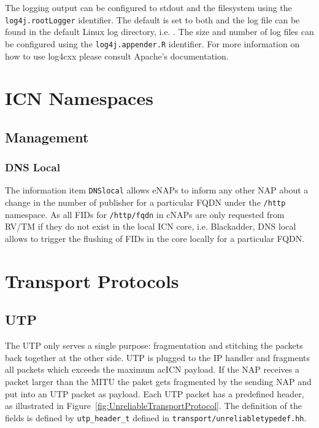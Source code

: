 \documentclass[a4paper,11pt,titlepage]{report}
\begin{document}
The logging output can be configured to stdout and the filesystem using the \texttt{log4j.rootLogger} identifier. The default is set to both and the log file can be found in the default Linux log directory, i.e. . The size and number of log files can be configured using the \texttt{log4j.appender.R} identifier. For more information on how to use log4cxx please consult Apache's documentation.

\chapter{ICN Namespaces}\label{ch:IcnNamespaces}
\section{Management}\label{sec:IcnNamespaces_Management}
\subsection{DNS Local}
The information item \texttt{DNSlocal} allows \acp{eNAP} to inform any other \ac{NAP} about a change in the number of publisher for a particular \ac{FQDN} under the \texttt{/http} namespace. As all \acp{FID} for \texttt{/http/fqdn} in \acp{cNAP} are only requested from RV/TM if they do not exist in the local ICN core, i.e. Blackadder, DNS local allows to trigger the flushing of \acp{FID} in the core locally for a particular \ac{FQDN}.
\chapter{Transport Protocols}
\section{\acl{UTP}}\label{sec:Transport_UTP}
The \ac{UTP} only serves a single purpose: fragmentation and stitching the packets back together at the other side. \ac{UTP} is plugged to the IP handler and fragments all packets which exceeds the maximum ac{ICN} payload. If the \ac{NAP} receives a packet larger than the \ac{MITU} the paket gets fragmented by the sending \ac{NAP} and put into an \ac{UTP} packet as payload. Each \ac{UTP} packet has a predefined header, as illustrated in Figure~\ref{fig:UnreliableTransportProtocol}. The definition of the fields is defined by \texttt{utp\_header\_t} defined in \texttt{transport/unreliabletypedef.hh}.
\end{document}
